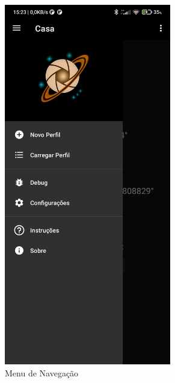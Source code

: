 \begin{figure}[!htb]
	\centering
	\caption{Menus}
	\label{overflowmenus}
	
	\begin{subfigure}[b]{0.3\textwidth}
		\centering
		\includegraphics[width=0.8\textwidth]{figuras/desAplicativo/menu}
		\caption{Menu de Navegação}
		\label{nivel}
	\end{subfigure}
	\hfill
	\begin{subfigure}[b]{0.3\textwidth}
		\centering

\end{subfigure}
\end{figure}
